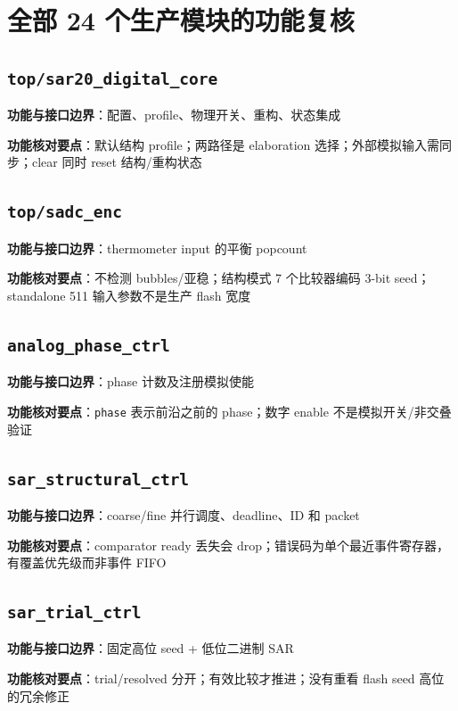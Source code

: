 \documentclass[UTF8,fontset=fandol,10pt,a4paper,openany]{ctexrep}
\newcommand{\code}[1]{\nolinkurl{#1}}
\begin{document}
\section{全部 24 个生产模块的功能复核}


\subsection*{\code{top/sar20_digital_core}}
\noindent\textbf{功能与接口边界}：配置、profile、物理开关、重构、状态集成\par
\noindent\textbf{功能核对要点}：默认结构 profile；两路径是 elaboration 选择；外部模拟输入需同步；clear 同时 reset 结构/重构状态\par
\subsection*{\code{top/sadc_enc}}
\noindent\textbf{功能与接口边界}：thermometer input 的平衡 popcount\par
\noindent\textbf{功能核对要点}：不检测 bubbles/亚稳；结构模式 7 个比较器编码 3-bit seed；standalone 511 输入参数不是生产 flash 宽度\par
\subsection*{\code{analog_phase_ctrl}}
\noindent\textbf{功能与接口边界}：phase 计数及注册模拟使能\par
\noindent\textbf{功能核对要点}：\code{phase} 表示前沿之前的 phase；数字 enable 不是模拟开关/非交叠验证\par
\subsection*{\code{sar_structural_ctrl}}
\noindent\textbf{功能与接口边界}：coarse/fine 并行调度、deadline、ID 和 packet\par
\noindent\textbf{功能核对要点}：comparator ready 丢失会 drop；错误码为单个最近事件寄存器，有覆盖优先级而非事件 FIFO\par
\subsection*{\code{sar_trial_ctrl}}
\noindent\textbf{功能与接口边界}：固定高位 seed + 低位二进制 SAR\par
\noindent\textbf{功能核对要点}：trial/resolved 分开；有效比较才推进；没有重看 flash seed 高位的冗余修正\par
\end{document}
